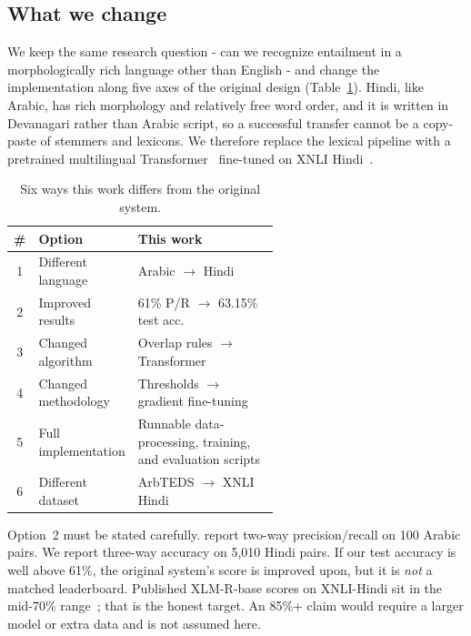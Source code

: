 \documentclass[conference]{IEEEtran}
\newcommand{\TestAcc}{63.15\%}
\begin{document}
\subsection{What we change}
We keep the same research question - can we recognize entailment in a morphologically rich language other than English - and change the implementation along five axes of the original design (Table~\ref{tab:options}). Hindi, like Arabic, has rich morphology and relatively free word order, and it is written in Devanagari rather than Arabic script, so a successful transfer cannot be a copy-paste of stemmers and lexicons. We therefore replace the lexical pipeline with a pretrained multilingual Transformer~\citep{conneau2020xlmr} fine-tuned on XNLI Hindi~\citep{conneau2018xnli}.

\begin{table}[!t]
\centering
\caption{Six ways this work differs from the original system.}
\label{tab:options}
\begin{tabular}{@{}clp{0.58\linewidth}@{}}
\toprule
\# & \textbf{Option} & \textbf{This work} \\
\midrule
1 & Different language & Arabic $\rightarrow$ Hindi \\
2 & Improved results & 61\% P/R $\rightarrow$ \TestAcc{} test acc. \\
3 & Changed algorithm & Overlap rules $\rightarrow$ Transformer \\
4 & Changed methodology & Thresholds $\rightarrow$ gradient fine-tuning \\
5 & Full implementation & Runnable data-processing, training, and evaluation scripts \\
6 & Different dataset & ArbTEDS $\rightarrow$ XNLI Hindi \\
\bottomrule
\end{tabular}
\end{table}

Option~2 must be stated carefully. \citet{khader2016textual} report two-way precision/recall on 100 Arabic pairs. We report three-way accuracy on 5{,}010 Hindi pairs. If our test accuracy is well above 61\%, the original system's score is improved upon, but it is \emph{not} a matched leaderboard. Published XLM-R-base scores on XNLI-Hindi sit in the mid-70\% range~\citep{conneau2020xlmr}; that is the honest target. An 85\%+ claim would require a larger model or extra data and is not assumed here.
\end{document}
